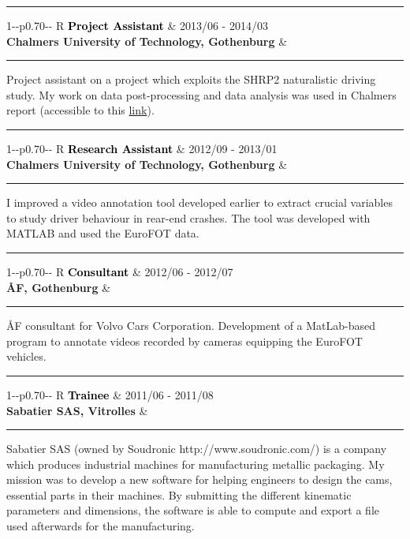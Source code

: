 \documentclass[10pt,A4]{article}
\newcommand{\mpwidth}{\linewidth-\fboxsep-\fboxsep}
\newcommand{\cvevent}[4]
{
\vspace{8pt}
	\begin{tabularx}{1\mpwidth}{p{0.70\mpwidth}  R}
	 \textcolor{black}{\textbf{#2}} & \textcolor{bgcol}{#1} \\
	 \textcolor{complcol}{\textbf{#3}} & 	 
	\end{tabularx}
\vspace{2pt}
\textcolor{softcol}{\hrule}
\vspace{2pt}
\begin{center}
\parbox{.95\mpwidth}{
#4
}
\end{center}
}
\begin{document}
{\begin{minipage}[c][0.98\textheight][t]{0.69\linewidth}
\textcolor{softcol}{\hrule}

\cvevent{2013/06 - 2014/03}{Project Assistant}{Chalmers University of Technology, Gothenburg}{Project assistant on a project which exploits the SHRP2 naturalistic driving study. My work on data post-processing and data analysis was used in Chalmers report (accessible to this \textcolor{complcol}{\href{http://www.trb.org/Publications/Blurbs/171327.aspx}{link}}).}

\textcolor{softcol}{\hrule}

\cvevent{2012/09 - 2013/01}{Research Assistant}{Chalmers University of Technology, Gothenburg}{I improved a video annotation tool developed earlier to extract crucial variables to study driver behaviour in rear-end crashes. The tool was developed with MATLAB and used the EuroFOT data.}

\textcolor{softcol}{\hrule}

\cvevent{2012/06 - 2012/07}{Consultant}{ÅF, Gothenburg}{ÅF consultant for Volvo Cars Corporation. Development of a MatLab-based program to annotate videos recorded by cameras equipping the EuroFOT vehicles. }

\textcolor{softcol}{\hrule}

\cvevent{2011/06 - 2011/08}{Trainee}{Sabatier SAS, Vitrolles}{
	Sabatier SAS (owned by Soudronic http://www.soudronic.com/) is a company which produces industrial machines for manufacturing metallic packaging. My mission was to develop a new software for helping engineers to design the cams, essential parts in their machines. By submitting the different kinematic parameters and dimensions, the software is able to compute and export a file used afterwards for the manufacturing.}


\end{minipage}}%
\end{document}

